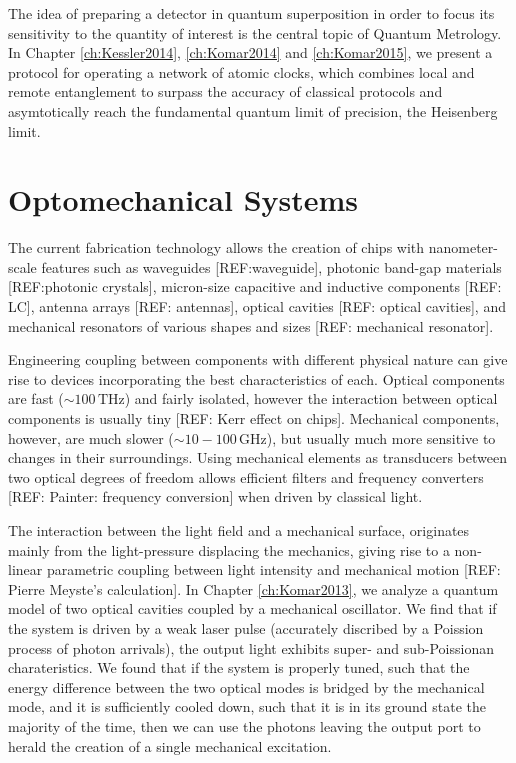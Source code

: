 The idea of preparing a detector in quantum
superposition in order to focus its sensitivity to the quantity of interest is
the central topic of Quantum Metrology. In Chapter \ref{ch:Kessler2014},
\ref{ch:Komar2014} and \ref{ch:Komar2015}, we present a
protocol for operating a network of atomic clocks, which combines local and
remote entanglement to surpass the accuracy of classical protocols and asymtotically
reach the fundamental quantum limit of precision, the Heisenberg limit. 


 
 
 
 
 
 
\section{Optomechanical Systems}
The current fabrication technology allows the creation of chips with
nanometer-scale features such as waveguides [REF:waveguide], photonic band-gap
materials [REF:photonic crystals], micron-size capacitive and inductive
components [REF: LC], antenna arrays [REF: antennas], optical cavities [REF:
optical cavities], and mechanical resonators of various shapes and sizes [REF:
mechanical resonator]. 

Engineering coupling between components with different physical nature can give
rise to devices incorporating the best characteristics of each. Optical
components are fast ($\sim 100\,\mathrm{THz}$) and fairly isolated, however the
interaction between optical components is usually tiny [REF: Kerr effect on
chips]. Mechanical components, however, are much slower ($\sim
10-100\,\mathrm{GHz}$), but usually much more sensitive to changes in their
surroundings. Using mechanical elements as transducers between two optical
degrees of freedom allows efficient filters and frequency converters [REF:
Painter: frequency conversion] when driven by classical light.

The interaction between the light field and a mechanical surface, originates
mainly from the light-pressure displacing the mechanics, giving rise to a
non-linear parametric coupling between light intensity and mechanical motion
[REF: Pierre Meyste's calculation]. In Chapter \ref{ch:Komar2013}, we
analyze a quantum model of two optical cavities coupled by a mechanical
oscillator. We find that if the system is driven by a weak laser pulse
(accurately discribed by a Poission process of photon arrivals), the output
light exhibits super- and sub-Poissionan charateristics. We found that if the
system is properly tuned, such that the energy difference between
the two optical modes is bridged by the mechanical mode, and it is sufficiently
cooled down, such that it is in its ground state the majority of the time,
then we can use the photons leaving the output port to herald the creation of a
single mechanical excitation.

